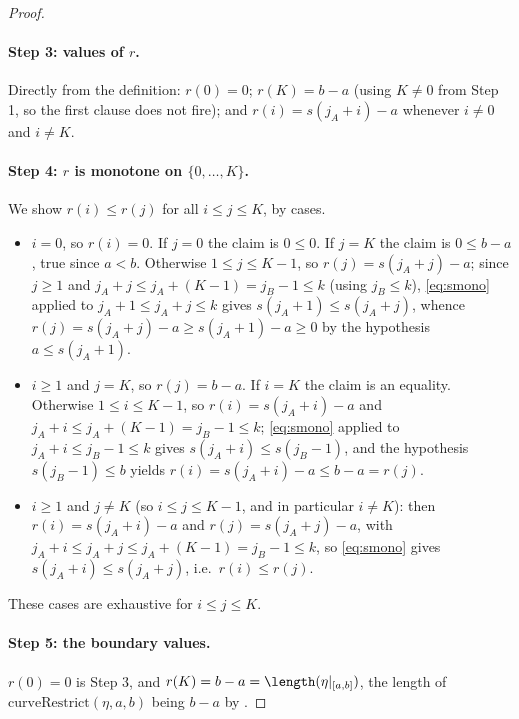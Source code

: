 \begin{proof}
  \paragraph{Step 3: values of $r$.} Directly from the definition: $r(0)=0$; $r(K)=b-a$ (using $K
  \ne 0$ from Step 1, so the first clause does not fire); and $r(i) = s(j_A+i)-a$ whenever $i \ne
  0$ and $i \ne K$.

  \paragraph{Step 4: $r$ is monotone on $\{0,\dots,K\}$.} We show $r(i) \le r(j)$ for all $i \le j
  \le K$, by cases.
  \begin{itemize}
    \item $i=0$, so $r(i)=0$. If $j=0$ the claim is $0\le0$. If $j=K$ the claim is $0 \le b-a$,
      true since $a<b$. Otherwise $1 \le j \le K-1$, so $r(j)=s(j_A+j)-a$; since $j \ge 1$ and
      $j_A+j \le j_A+(K-1) = j_B-1 \le k$ (using $j_B \le k$), \eqref{eq:smono} applied to
      $j_A+1 \le j_A+j \le k$ gives $s(j_A+1) \le s(j_A+j)$, whence $r(j) = s(j_A+j)-a \ge
      s(j_A+1)-a \ge 0$ by the hypothesis $a \le s(j_A+1)$.
    \item $i \ge 1$ and $j=K$, so $r(j)=b-a$. If $i=K$ the claim is an equality. Otherwise $1 \le i
      \le K-1$, so $r(i)=s(j_A+i)-a$ and $j_A+i \le j_A+(K-1) = j_B-1 \le k$; \eqref{eq:smono}
      applied to $j_A+i \le j_B-1 \le k$ gives $s(j_A+i) \le s(j_B-1)$, and the hypothesis
      $s(j_B-1) \le b$ yields $r(i) = s(j_A+i)-a \le b-a = r(j)$.
    \item $i \ge 1$ and $j \ne K$ (so $i \le j \le K-1$, and in particular $i \ne K$): then
      $r(i)=s(j_A+i)-a$ and $r(j)=s(j_A+j)-a$, with $j_A+i \le j_A+j \le j_A+(K-1)=j_B-1 \le k$, so
      \eqref{eq:smono} gives $s(j_A+i) \le s(j_A+j)$, i.e.\ $r(i) \le r(j)$.
  \end{itemize}
  These cases are exhaustive for $i \le j \le K$.

  \paragraph{Step 5: the boundary values.} $r(0)=0$ is Step 3, and $r(K)=b-a =
  \length(\eta|_{[a,b]})$, the length of $\mathrm{curveRestrict}(\eta,a,b)$ being $b-a$ by
  .


\end{proof}
